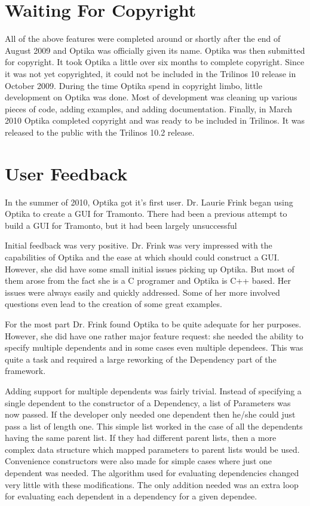 \section{Waiting For Copyright}
	All of the above features were completed around or shortly after the end of August 2009 and Optika was officially given its name.
	Optika was then submitted for copyright. It took Optika a little over six months to complete copyright.
	Since it was not yet copyrighted, it could not be included in the Trilinos 10 release in October 2009. During the time Optika spend in copyright limbo, 
	little development on Optika was done. Most of development was cleaning up various pieces of code, adding examples, and adding documentation. 
	Finally, in March 2010 Optika completed copyright and was ready to be included in Trilinos. It was released to the public with the Trilinos 10.2 release.

\section{User Feedback}
In the summer of 2010, Optika got it's first user. Dr. Laurie Frink began using Optika to create a GUI for Tramonto.
There had been a previous attempt to build a GUI for Tramonto, but it had been largely unsuccessful

Initial feedback was very positive. Dr. Frink was very impressed with the capabilities of Optika and the ease at which should could construct a
GUI. However, she did have some small initial issues picking up Optika. But most of them arose from the fact she is a C programer and Optika is C++ based.
Her issues were always easily and quickly addressed. Some of her more involved questions even lead to the creation of some great examples. 

For the most part Dr. Frink found Optika to be quite adequate for her purposes. However, she did have one rather major feature request: 
she needed the ability to specify multiple dependents and in some cases even multiple dependees. This was quite a task and required a 
large reworking of the Dependency part of the framework. 

Adding support for multiple dependents was fairly trivial. Instead of specifying a single dependent to the constructor of a Dependency, a list
of Parameters was now passed. If the developer only needed one dependent then he/she could just pass a list of length one. This simple
list worked in the case of all the dependents having the same parent list. If they had different parent lists, then a more complex 
data structure which mapped parameters to parent lists would be used. Convenience constructors were also made for simple cases where
just one dependent was needed. The algorithm used for evaluating dependencies changed very little with these modifications. The only addition
needed was an extra loop for evaluating each dependent in a dependency for a given dependee.

